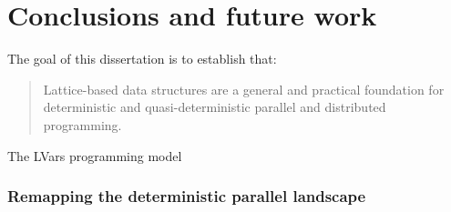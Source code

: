 \chapter{Conclusions and future work}\label{ch:conclusion} %

The goal of this dissertation is to establish that:
\begin{quote}
  Lattice-based data structures are a general and practical foundation
  for deterministic and quasi-deterministic parallel and distributed
  programming.
\end{quote}
The LVars programming model

\subsection{Remapping the deterministic parallel landscape}

